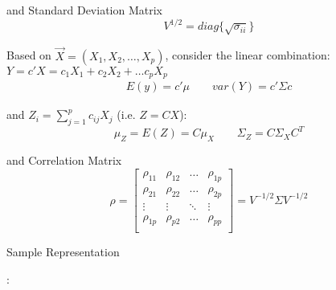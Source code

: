 \begin{itemize}[topsep=6pt,itemsep=4pt]
    and Standard Deviation Matrix
    \begin{equation}
        V^{1/2}=diag\{\sqrt{\sigma _{ii}}\} 
    \end{equation}

    Based on $ \vec{X}=(X_{1},X_{2},\ldots,X_{p})  $, consider the linear combination:$ Y=c'X=c_1X_1+c_2X_2+\ldots c_pX_p $
    \begin{align*}
        E(y)=c'\mu\qquad var(Y)=c'\Sigma c
    \end{align*}

    and $ Z_i=\sum_{j=1}^p c_{ij}X_j $ (i.e. $ Z=CX $):
    \begin{equation}
        \mu_Z=E(Z)= C\mu_X\qquad \Sigma _Z=C\Sigma _XC^T
    \end{equation}
    
    
    
    

    and Correlation Matrix
    \begin{equation}
        \rho =\begin{bmatrix}
        \rho _{11}&\rho _{12}&\ldots&\rho _{1p}\\
        \rho _{21}&\rho _{22}&\ldots&\rho _{2p}\\
        \vdots&\vdots&\ddots&\vdots\\
        \rho _{1p}&\rho _{p2}&\ldots&\rho _{pp}\\
        \end{bmatrix} 
        =V^{-1/2}\Sigma V^{-1/2}
    \end{equation}
    
    

    
    
    
    
    
    \end{itemize}
    
        
\begin{point}
    \hypertarget{SampleRepresentation}{Sample Representation}:
\end{point}
    
